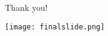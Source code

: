 \documentclass{beamer}
\begin{document}
\begin{frame}{}
  \titlepage
\end{frame}




\begin{frame}{Thank you!\\}
\begin{center}
\begin{LARGE}
 \texttt{[image: finalslide.png]}
\end{LARGE}
\end{center}
\end{frame}
\end{document}
